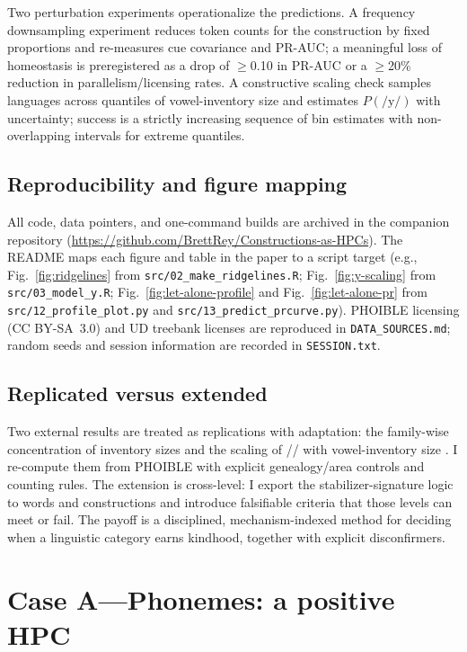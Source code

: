 \documentclass[12pt]{article}
\begin{document}
Two perturbation experiments operationalize the predictions. A frequency downsampling experiment reduces token counts for the construction by fixed proportions and re-measures cue covariance and PR-AUC; a meaningful loss of homeostasis is preregistered as a drop of $\ge$0.10 in PR-AUC or a $\ge$20\% reduction in parallelism/licensing rates. A constructive scaling check samples languages across quantiles of vowel-inventory size and estimates $P(\text{/y/})$ with uncertainty; success is a strictly increasing sequence of bin estimates with non-overlapping intervals for extreme quantiles.

\subsection*{Reproducibility and figure mapping}

All code, data pointers, and one-command builds are archived in the companion repository (\url{https://github.com/BrettRey/Constructions-as-HPCs}). The README maps each figure and table in the paper to a script target (e.g., Fig.~\ref{fig:ridgelines} from \texttt{src/02\_make\_ridgelines.R}; Fig.~\ref{fig:y-scaling} from \texttt{src/03\_model\_y.R}; Fig.~\ref{fig:let-alone-profile} and Fig.~\ref{fig:let-alone-pr} from \texttt{src/12\_profile\_plot.py} and \texttt{src/13\_predict\_prcurve.py}). PHOIBLE licensing (CC BY-SA~3.0) and UD treebank licenses are reproduced in \texttt{DATA\_SOURCES.md}; random seeds and session information are recorded in \texttt{SESSION.txt}.

\subsection*{Replicated versus extended}

Two external results are treated as replications with adaptation: the family-wise concentration of inventory sizes and the scaling of // with vowel-inventory size \citep[Fig.\,1; Fig.\,2]{Ekstrom2025PhonemeTool}. I re-compute them from PHOIBLE with explicit genealogy/area controls and counting rules. The extension is cross-level: I export the stabilizer-signature logic to words and constructions and introduce falsifiable criteria that those levels can meet or fail. The payoff is a disciplined, mechanism-indexed method for deciding when a linguistic category earns kindhood, together with explicit disconfirmers.



\section{Case A—Phonemes: a positive HPC}\label{sec:case-phoneme}
\end{document}

